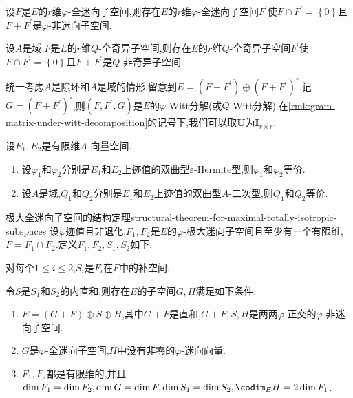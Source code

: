 \begin{corollary}{}{}
	设$F$是$E$的$r$维$\varphi$-全迷向子空间,则存在$E$的$r$维$\varphi$-全迷向子空间$F^{\prime}$使$F\cap F^{\prime}=\left\{0\right\}$且$F+F^{\prime}$是$\varphi$-非迷向子空间.
\end{corollary}

\begin{corollary}{}{}
	设$A$是域,$F$是$E$的$r$维$Q$-全奇异子空间,则存在$E$的$r$维$Q$-全奇异子空间$F^{\prime}$使$F\cap F^{\prime}=\left\{0\right\}$且$F+F^{\prime}$是$Q$-非奇异子空间.
\end{corollary}

\begin{remark}{}{}
	统一考虑$A$是除环和$A$是域的情形.留意到$E=\left(F+F^{\prime}\right)\oplus\left(F+F^{\prime}\right)^{\circ}$,记$G=\left(F+F^{\prime}\right)^{\circ}$,则$\left(F,F^{\prime},G\right)$是$E$的$\varphi$-Witt分解(或$Q$-Witt分解).在\cref{rmk:gram-matrix-under-witt-decomposition}的记号下,我们可以取$\boldsymbol{U}$为$\boldsymbol{I}_{r\times r}$.
\end{remark}

\begin{corollary}{}{}
	设$E_{1},E_{2}$是有限维$A$-向量空间.
	\begin{enumerate}
		\item 设$\varphi_{1}$和$\varphi_{2}$分别是$E_{1}$和$E_{2}$上迹值的双曲型$\varepsilon$-Hermite型,则$\varphi_{1}$和$\varphi_{2}$等价.
		\item 设$A$是域,$Q_{1}$和$Q_{2}$分别是$E_{1}$和$E_{2}$上迹值的双曲型$A$-二次型,则$Q_{1}$和$Q_{2}$等价.
	\end{enumerate}
\end{corollary}

\begin{proposition}{极大全迷向子空间的结构定理}{structural-theorem-for-maximal-totally-isotropic-subspaces}
	设$\varphi$迹值且非退化,$F_{1},F_{2}$是$E$的$\varphi$-极大迷向子空间且至少有一个有限维,$F=F_{1}\cap F_{2}$.定义$F_{1},F_{2},S_{1},S_{2}$如下:
	\begin{center}
		对每个$1\leq i\leq 2$,$S_{i}$是$F_{i}$在$F$中的补空间.
	\end{center}
	令$S$是$S_{1}$和$S_{2}$的内直和,则存在$E$的子空间$G,H$满足如下条件:
	\begin{enumerate}
		\item $E=\left(G+F\right)\oplus S\oplus H$,其中$G+F$是直和,$G+F,S,H$是两两$\varphi$-正交的$\varphi$-非迷向子空间.
		\item $G$是$\varphi$-全迷向子空间,$H$中没有非零的$\varphi$-迷向向量.
		\item $F_{1},F_{2}$都是有限维的,并且$\dim F_{1}=\dim F_{2},\dim G=\dim F,\dim S_{1}=\dim S_{2},\codim_{E}H=2\dim F_{1}$.
	\end{enumerate}
\end{proposition}

